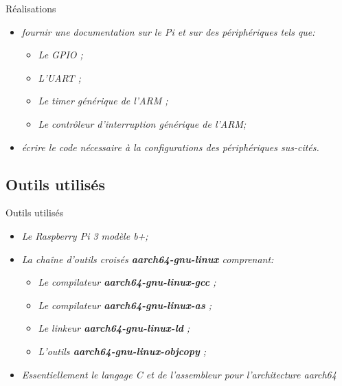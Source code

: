 \documentclass[french]{beamer}
\begin{document}
\begin{frame}{Réalisations}
	\transsplitverticalout
	\begin{beamerboxesrounded}[scheme=blocgrisclair]{}
		\begin{center}
			\begin{itemize}
				\color{nb}
				\large
				\item<1-> \textit{fournir une documentation sur le Pi et sur des périphériques tels que: }
				\begin{itemize}
					\color{white}
					\item<2-> \textit{Le GPIO ;}
					\item<3-> \textit{L'UART ;}
					\item<4-> \textit{Le timer générique de l'ARM ;}
					\item<5-> \textit{Le contrôleur d'interruption générique de l'ARM;}
				\end{itemize}
				\item<6-> \textit{écrire le code nécessaire à la configurations des périphériques sus-cités.}
			\end{itemize}
		\end{center}
	\end{beamerboxesrounded}
\end{frame}


\subsection{Outils utilisés}
\begin{frame}
	\transsplitverticalout
\end{frame}

\begin{frame}{Outils utilisés}
	\transsplitverticalout
	\begin{beamerboxesrounded}[scheme=blocgrisclair]{}
	\begin{center}
		\begin{itemize}
			\color{nb}
			\large
			\item<1-> \textit{Le Raspberry Pi 3 modèle b+;}	
			\item<3-> \textit{La chaîne d'outils croisés \textbf{aarch64-gnu-linux} comprenant: }
			\begin{itemize}
				\color{white}
				\item<4-> \textit{Le compilateur \textbf{aarch64-gnu-linux-gcc} ;}
				\item<5-> \textit{Le compilateur \textbf{aarch64-gnu-linux-as} ;}
				\item<6-> \textit{Le linkeur \textbf{aarch64-gnu-linux-ld} ;}
				\item<7-> \textit{L'outils \textbf{aarch64-gnu-linux-objcopy} ;}
			\end{itemize}
			\item<2-> \textit{Essentiellement le langage C et de l'assembleur pour l'architecture aarch64}
		\end{itemize}
	\end{center}
	\end{beamerboxesrounded}
\end{frame}
\end{document}
